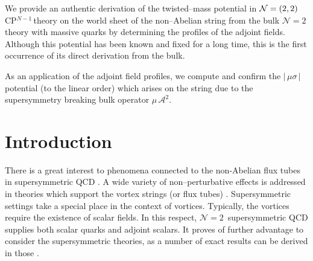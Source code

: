 \documentclass[12pt]{article}
\newcommand{\ntwo}{${\mathcal N}=2$}
\newcommand{\ntwon}{${\mathcal N}=2$}
\newcommand{\ca}{{\mathcal A}}
\newcommand{\cpn}{CP$^{N-1}$\,}
\begin{document}
\begin{titlepage}
	We provide an authentic derivation of the twisted--mass potential in $ {\cal N}=(2,2) $ \cpn theory 
	on the world sheet of the non--Abelian string from the bulk \ntwo\, theory with massive quarks
	by determining the profiles of the adjoint fields.
	Although this potential has been known and fixed for a long time, this is the first occurrence
	of its direct derivation from the bulk.

	As an application of the adjoint field profiles, we compute and confirm the $ |\, \mu \sigma \,| $ potential
	(to the linear order) which arises on the string due to the supersymmetry breaking bulk operator $ \mu\, \ca^2 $.

\vspace{2cm}


\end{titlepage}




\section{Introduction}
\setcounter{equation}{0}

	There is a great interest to phenomena connected to the non-Abelian flux tubes in supersymmetric QCD
	\cite{Trev,SYrev,Shifman:2010id,Koroteev:2011rb,Eto:2011cv,Chen:2012wda,Konishi:2012eq,Konishi:2012kx}.
	A wide variety of non--perturbative effects is addressed in theories 
	which support the vortex strings (or flux tubes) 
	\cite{Shifman:2010id,Eto:2012aa,Huo:2012hf,Yasui:2012zb}.
	Supersymmetric settings take a special place in the context of vortices.
	Typically, the vortices require the existence of scalar fields. 
	In this respect, \ntwon\, supersymmetric QCD supplies both scalar quarks and adjoint scalars.
	It proves of further advantage to consider the supersymmetric theories, as a number of exact results
	can be derived in those 
	\cite{Novikov:1983uc,Seiberg:1994rs,Seiberg:1994aj,Shifman:2013ewa}.
\end{document}
